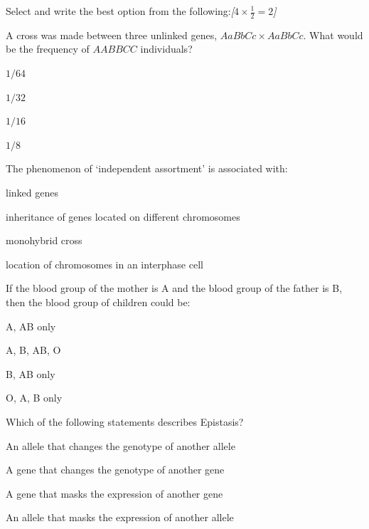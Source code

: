 \documentclass[11pt,a4paper]{article}
\newcommand{\pts}[1]{\hfill   \textit{[#1]}}
\begin{document}
\begin{parts}
  \item Select and write the best option from the following:\pts{$4  \times \frac{1}{2} = 2$}
  
\begin{parts}
    \item A cross was made between three unlinked genes, $AaBbCc  \times AaBbCc$. What would be the frequency of $AABBCC$ individuals?
    
\begin{parts}
      \item $1/64$
      \item $1/32$
      \item $1/16$
      \item $1/8$
    \end{parts}
    
    \item The phenomenon of `independent assortment' is associated with:
    
\begin{parts}
      \item linked genes
      \item inheritance of genes located on different chromosomes
      \item monohybrid cross
      \item location of chromosomes in an interphase cell
    \end{parts}
    
    \item If the blood group of the mother is A and the blood group of the father is B, then the blood group of children could be:
    
\begin{parts}
      \item A, AB only
      \item A, B, AB, O
      \item B, AB only
      \item O, A, B only
    \end{parts}
    
    \item Which of the following statements describes Epistasis?
    
\begin{parts}
      \item An allele that changes the genotype of another allele
      \item A gene that changes the genotype of another gene
      \item A gene that masks the expression of another gene
      \item An allele that masks the expression of another allele
    \end{parts}
  \end{parts}


\end{parts}
\end{document}
